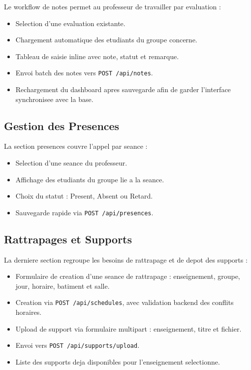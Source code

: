 \documentclass[12pt,a4paper]{report}
\begin{document}
Le workflow de notes permet au professeur de travailler par evaluation :

\begin{itemize}[itemsep=0.3em]
    \item Selection d'une evaluation existante.
    \item Chargement automatique des etudiants du groupe concerne.
    \item Tableau de saisie inline avec note, statut et remarque.
    \item Envoi batch des notes vers \texttt{POST /api/notes}.
    \item Rechargement du dashboard apres sauvegarde afin de garder l'interface synchronisee avec la base.
\end{itemize}

\subsection{Gestion des Presences}

La section presences couvre l'appel par seance :

\begin{itemize}[itemsep=0.3em]
    \item Selection d'une seance du professeur.
    \item Affichage des etudiants du groupe lie a la seance.
    \item Choix du statut : Present, Absent ou Retard.
    \item Sauvegarde rapide via \texttt{POST /api/presences}.
\end{itemize}

\subsection{Rattrapages et Supports}

La derniere section regroupe les besoins de rattrapage et de depot des supports :

\begin{itemize}[itemsep=0.3em]
    \item Formulaire de creation d'une seance de rattrapage : enseignement, groupe, jour, horaire, batiment et salle.
    \item Creation via \texttt{POST /api/schedules}, avec validation backend des conflits horaires.
    \item Upload de support via formulaire multipart : enseignement, titre et fichier.
    \item Envoi vers \texttt{POST /api/supports/upload}.
    \item Liste des supports deja disponibles pour l'enseignement selectionne.
\end{itemize}
\end{document}
